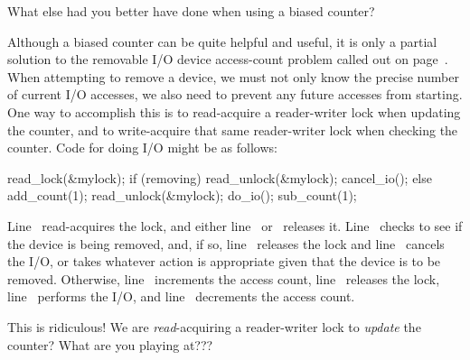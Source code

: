 \QuickQuiz{}
	What else had you better have done when using a biased counter?
 \QuickQuizEnd

Although a biased counter can be quite helpful and useful, it is only a
partial solution to the removable I/O device access-count problem
called out on
page~\pageref{chp:Counting}.
When attempting to remove a device, we must not only know the precise
number of current I/O accesses, we also need to prevent any future
accesses from starting.
One way to accomplish this is to read-acquire a reader-writer lock
when updating the counter, and to write-acquire that same reader-writer
lock when checking the counter.
Code for doing I/O might be as follows:

\begin{linelabel}
\begin{VerbatimN}[commandchars=\\\[\]]
read_lock(&mylock);		\lnlbl[acq]
if (removing) {			\lnlbl[check]
	read_unlock(&mylock);	\lnlbl[rel1]
	cancel_io();		\lnlbl[cancel]
} else {
	add_count(1);		\lnlbl[inc]
	read_unlock(&mylock);	\lnlbl[rel2]
	do_io();		\lnlbl[do]
	sub_count(1);		\lnlbl[dec]
}
\end{VerbatimN}
\end{linelabel}

\begin{lineref}
Line~ read-acquires the lock, and either
line~ or~ releases it.
Line~ checks to see if the device is being removed, and, if so,
line~ releases the lock and
line~ cancels the I/O, or takes whatever
action is appropriate given that the device is to be removed.
Otherwise, line~ increments the access count,
line~ releases the
lock, line~ performs the I/O, and
line~ decrements the access count.
\end{lineref}

\QuickQuiz{}
	This is ridiculous!
	We are \emph{read}-acquiring a reader-writer lock to
	\emph{update} the counter?
	What are you playing at???
 \QuickQuizEnd

